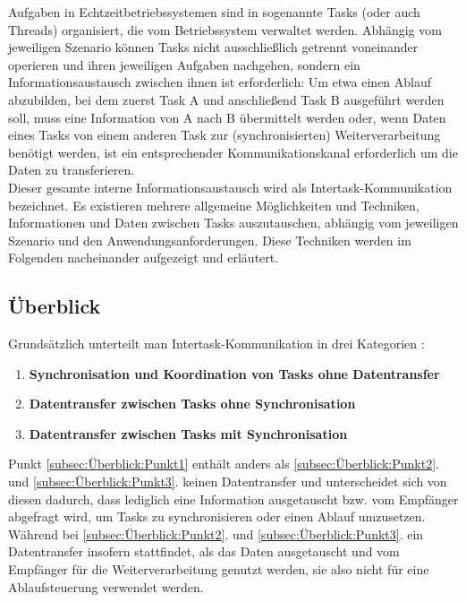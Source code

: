 \documentclass{llncs}
\begin{document}
Aufgaben in Echtzeitbetriebssystemen sind in sogenannte Tasks (oder auch Threads) organisiert, die vom Betriebssystem verwaltet werden. Abhängig vom jeweiligen Szenario können Tasks nicht ausschließlich getrennt voneinander operieren und ihren jeweiligen Aufgaben nachgehen, sondern ein Informationsaustausch zwischen ihnen ist erforderlich: Um etwa einen Ablauf abzubilden, bei dem zuerst Task A und anschließend Task B ausgeführt werden soll, muss eine Information von A nach B übermittelt werden oder, wenn Daten eines Tasks von einem anderen Task zur (synchronisierten) Weiterverarbeitung benötigt werden, ist ein entsprechender Kommunikationskanal erforderlich um die Daten zu transferieren.\\

Dieser gesamte interne Informationsaustausch wird als Intertask-Kommunikation bezeichnet. Es existieren mehrere allgemeine Möglichkeiten und Techniken, Informationen und Daten zwischen Tasks auszutauschen, abhängig vom jeweiligen Szenario und den Anwendungsanforderungen. Diese Techniken werden im Folgenden nacheinander aufgezeigt und erläutert.

\subsection{Überblick}
\label{subsec:Überblick}
Grundsätzlich unterteilt man Intertask-Kommunikation in drei Kategorien \autocite[vgl.][79]{Cooling2017}:
\begin{enumerate}
	\setlength\itemsep{0.5em} %
	\item \textbf{Synchronisation und Koordination von Tasks ohne Datentransfer}  \label{subsec:Überblick:Punkt1}
	\item \textbf{Datentransfer zwischen Tasks ohne Synchronisation} \label{subsec:Überblick:Punkt2}
	\item \textbf{Datentransfer zwischen Tasks mit Synchronisation} \label{subsec:Überblick:Punkt3}
\end{enumerate}
Punkt \ref{subsec:Überblick:Punkt1} enthält anders als \ref{subsec:Überblick:Punkt2}. und \ref{subsec:Überblick:Punkt3}. keinen Datentransfer und unterscheidet sich von diesen dadurch, dass lediglich eine Information ausgetauscht bzw. vom Empfänger abgefragt wird, um Tasks zu synchronisieren oder einen Ablauf umzusetzen. Während bei \ref{subsec:Überblick:Punkt2}. und \ref{subsec:Überblick:Punkt3}. ein Datentransfer insofern stattfindet, als das Daten ausgetauscht und vom Empfänger für die Weiterverarbeitung genutzt werden, sie also nicht für eine Ablaufsteuerung verwendet werden. 
\end{document}
